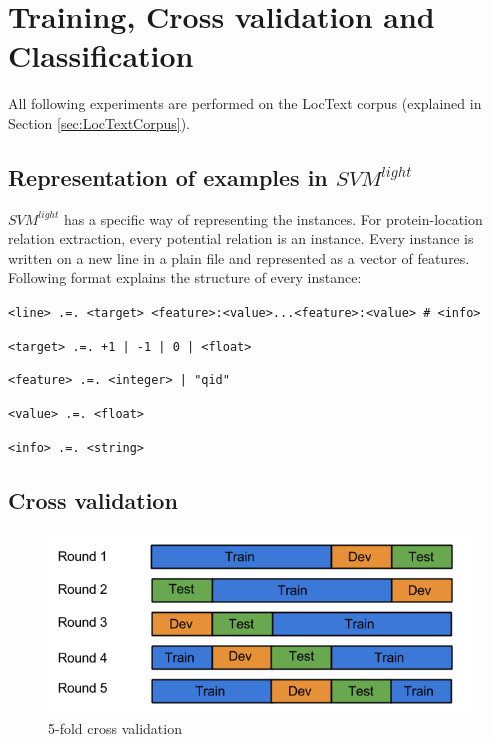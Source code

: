 \section{Training, Cross validation and Classification}\label{sec:training}

All following experiments are performed on the LocText \cite{loctext} corpus (explained in Section \ref{sec:LocTextCorpus}).

\subsection{Representation of examples in $SVM^{light}$ }

$SVM^{light}$ \cite{joachims1999making} has a specific way of representing the instances. For protein-location relation extraction, every potential relation is an instance. Every instance is written on a new line in a plain file and represented as a vector of features. Following format explains the structure of every instance:

\bigskip

\texttt{<line> .=. <target> <feature>:<value>...<feature>:<value> \# <info>}

\texttt{<target> .=. +1 | -1 | 0 | <float>}

\texttt{<feature> .=. <integer> | "qid"}

\texttt{<value> .=. <float>}

\texttt{<info> .=. <string>}

\subsection{Cross validation}

\begin{figure}
\centering
\includegraphics[scale=0.6]{figures/CrossValidation.png}
\caption{5-fold cross validation}\label{fig:crossVal}
\end{figure}

